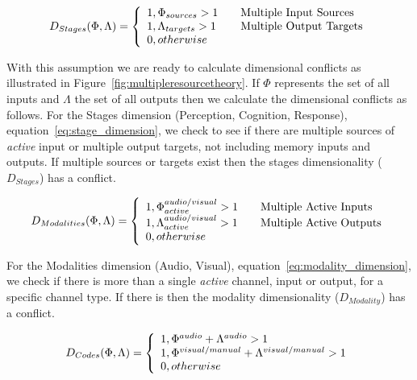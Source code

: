 \begin{equation}
D_{Stages}(\Phi, \Lambda) = \left\{ 
  \begin{array}{l l}
    1, \Phi_{sources} > 1 & \quad \text{Multiple Input Sources}\\
    1, \Lambda_{targets} > 1 & \quad \text{Multiple Output Targets}\\
    0, otherwise
  \end{array}
  \right.
  \label{eq:stage_dimension}
\end{equation}

With this assumption we are ready to calculate dimensional conflicts as illustrated in Figure~\ref{fig:multipleresourcetheory}.  If $\Phi$ represents the set of all inputs and $\Lambda$ the set of all outputs then we calculate the dimensional conflicts as follows.  For the Stages dimension (Perception, Cognition, Response), equation~\ref{eq:stage_dimension}, we check to see if there are multiple sources of {\em active} input or multiple output targets, not including memory inputs and outputs.  If multiple sources or targets exist then the stages dimensionality ($D_{Stages}$) has a conflict.

\begin{equation}
D_{Modalities}(\Phi, \Lambda) = \left\{ 
  \begin{array}{l l}
    1, \Phi_{active}^{audio/visual} > 1 & \quad \text{Multiple Active Inputs}\\
    1, \Lambda_{active}^{audio/visual} > 1 & \quad \text{Multiple Active Outputs}\\
    0, otherwise
  \end{array}
  \right.
  \label{eq:modality_dimension}
\end{equation}

For the Modalities dimension (Audio, Visual), equation~\ref{eq:modality_dimension}, we check if there is more than a single {\em active} channel, input or output, for a specific channel type.  If there is then the modality dimensionality ($D_{Modality}$) has a conflict.

\begin{equation}
D_{Codes}(\Phi, \Lambda) = \left\{ 
  \begin{array}{l l}
    1, \Phi^{audio} + \Lambda^{audio} > 1\\
    1, \Phi^{visual/manual} + \Lambda^{visual/manual} > 1\\
    0, otherwise
  \end{array}
  \right.
  \label{eq:codes_dimension}
\end{equation}

